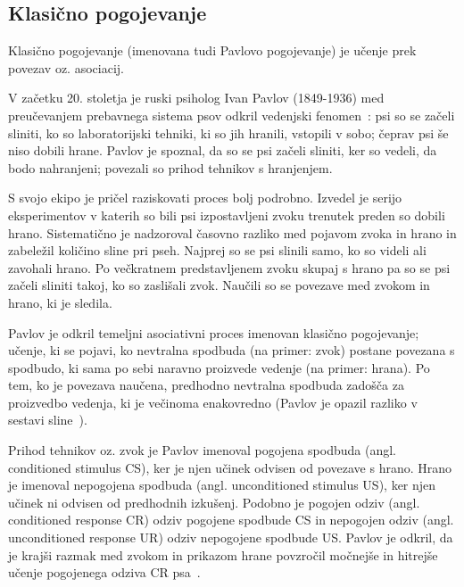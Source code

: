 \documentclass[a4paper, oneside, 12pt]{report}
\begin{document}
\subsection{Klasično pogojevanje}
Klasično pogojevanje (imenovana tudi Pavlovo pogojevanje) je učenje prek povezav oz. asociacij.

V začetku 20. stoletja je ruski psiholog Ivan Pavlov (1849-1936) med preučevanjem prebavnega sistema psov odkril vedenjski fenomen~\cite{ConditionedReflexes}: psi so se začeli sliniti, ko so laboratorijski tehniki, ki so jih hranili, vstopili v sobo; čeprav psi še niso dobili hrane. Pavlov je spoznal, da so se psi začeli sliniti, ker so vedeli, da bodo nahranjeni; povezali so prihod tehnikov s hranjenjem.

S svojo ekipo je pričel raziskovati proces bolj podrobno. Izvedel je serijo eksperimentov v katerih so bili psi izpostavljeni zvoku trenutek preden so dobili hrano. Sistematično je nadzoroval časovno razliko med pojavom zvoka in hrano in zabeležil količino sline pri pseh. Najprej so se psi slinili samo, ko so videli ali zavohali hrano. Po večkratnem predstavljenem zvoku skupaj s hrano pa so se psi začeli sliniti takoj, ko so zaslišali zvok. Naučili so se povezave med zvokom in hrano, ki je sledila.

Pavlov je odkril temeljni asociativni proces imenovan klasično pogojevanje; učenje, ki se pojavi, ko nevtralna spodbuda (na primer: zvok) postane povezana s spodbudo, ki sama po sebi naravno proizvede vedenje (na primer: hrana). Po tem, ko je povezava naučena, predhodno nevtralna spodbuda zadošča za proizvedbo vedenja, ki je večinoma enakovredno (Pavlov je opazil razliko v sestavi sline~\cite{PavlovianConditioningItsNotWhatYouThinkItIs, LearningAndBehaviorAContemporarySynthesis, CognitionEvolutionAndBehavior}).

Prihod tehnikov oz. zvok je Pavlov imenoval pogojena spodbuda (angl. conditioned stimulus CS), ker je njen učinek odvisen od povezave s hrano. Hrano je imenoval nepogojena spodbuda (angl. unconditioned stimulus US), ker njen učinek ni odvisen od predhodnih izkušenj. Podobno je pogojen odziv (angl. conditioned response CR) odziv pogojene spodbude CS in nepogojen odziv (angl. unconditioned response UR) odziv nepogojene spodbude US. Pavlov je odkril, da je krajši razmak med zvokom in prikazom hrane povzročil močnejše in hitrejše učenje pogojenega odziva CR psa~\cite{PsychologyAStudentFriendlyApproach}.
\end{document}
